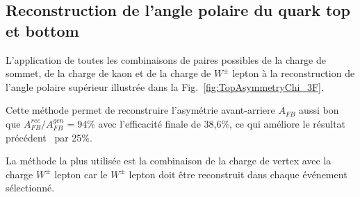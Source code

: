 \newpage
\subsection*{Reconstruction de l'angle polaire du quark top et bottom}

L'application de toutes les combinaisons de paires possibles de la charge de sommet, de la charge de kaon et de la charge de $W^\pm$ lepton à la reconstruction de l'angle polaire supérieur illustrée dans la Fig.~\ref {fig:TopAsymmetryChi_3F}.

Cette méthode permet de reconstruire l'asymétrie avant-arriere $A_{FB}$ aussi bon que $A_ {FB}^{rec} / A^{gen}_{FB} = 94\%$ avec l'efficacité finale de 38,6\%, ce qui améliore le résultat précédent~\cite {bib:ILCTOP} par 25\%.

La méthode la plus utilisée est la combinaison de la charge de vertex avec la charge $W^\pm$ lepton car le $ W^\pm$ lepton doit être reconstruit dans chaque événement sélectionné.

